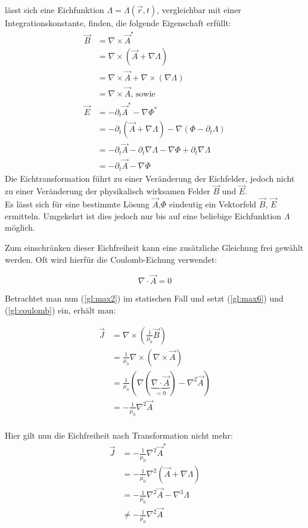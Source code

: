 lässt sich eine Eichfunktion $\Lambda=\Lambda(\vec{r},t)$, vergleichbar mit einer Integrationskonstante, finden, die folgende Eigenschaft erfüllt:
\begin{align*}
\vec{B} &= \nabla \times \vec{A}^* \\ &= \nabla \times(\vec{A} + \nabla\Lambda) \\ &= \nabla\times\vec{A} + \nabla\times(\nabla\Lambda) \\ &= \nabla \times \vec{A} \text{, sowie }\\
\vec{E} &= -\partial_t\vec{A}^* - \nabla\Phi^*\\
&= -\partial_t(\vec{A} + \nabla\Lambda) - \nabla(\Phi - \partial_t\Lambda) \\
&= -\partial_t\vec{A} -\partial_t\nabla\Lambda - \nabla\Phi + \partial_t\nabla\Lambda\\
&= -\partial_t\vec{A} - \nabla\Phi
\end{align*}
Die Eichtransformation führt zu einer Veränderung der Eichfelder, jedoch nicht zu einer Veränderung der physikalisch wirksamen Felder $\vec{B}$ und $\vec{E}$.\\Es lässt sich für eine bestimmte Lösung $\vec{A}$,$\Phi$ eindeutig ein Vektorfeld $\vec{B}$, $\vec{E}$ ermitteln. Umgekehrt ist dies jedoch nur bis auf eine beliebige Eichfunktion $\Lambda$ möglich.

Zum einschränken dieser Eichfreiheit kann eine zusätzliche Gleichung frei gewählt werden. Oft wird hierfür die Coulomb-Eichung verwendet:

\begin{equation}
\label{gl:coulomb}
\nabla \cdot \vec{A} = 0
\end{equation}

Betrachtet man nun (\ref{gl:max2}) im statischen Fall und setzt (\ref{gl:max6}) und (\ref{gl:coulomb}) ein, erhält man:

\begin{align*}
 \vec{J} &= \nabla \times \left(\frac{1}{\mu_0}\vec{B}\right) \\
 &= \frac{1}{\mu_0} \nabla \times (\nabla\times\vec{A}) \\
 &= \frac{1}{\mu_0} (\nabla(\underbrace{\nabla\cdot\vec{A}}_{=0}) - \nabla^2\vec{A}) \\
 &= -\frac{1}{\mu_0}\nabla^2\vec{A} \\
\end{align*}

Hier gilt nun die Eichfreiheit nach Transformation nicht mehr:
\begin{align*}
\vec{J} &= -\frac{1}{\mu_0}\nabla^2\vec{A}^* \\
&= -\frac{1}{\mu_0}\nabla^2(\vec{A}+\nabla\Lambda) \\
&= -\frac{1}{\mu_0}\nabla^2\vec{A} - \nabla^3\Lambda \\
&\neq -\frac{1}{\mu_0}\nabla^2\vec{A}
\end{align*}
